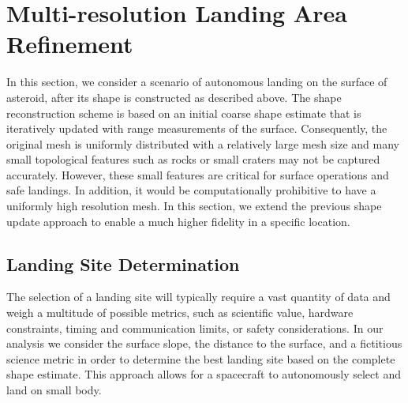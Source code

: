\documentclass[journal]{new-aiaa}
\begin{document}
\section{Multi-resolution Landing Area Refinement}\label{sec:landing_refinement}

In this section, we consider a scenario of autonomous landing on the surface of asteroid, after its shape is constructed as described above.
The shape reconstruction scheme is based on an initial coarse shape estimate that is iteratively updated with range measurements of the surface.
Consequently, the original mesh is uniformly distributed with a relatively large mesh size and many small topological features such as rocks or small craters may not be captured accurately.
However, these small features are critical for surface operations and safe landings.
In addition, it would be computationally prohibitive to have a uniformly high resolution mesh.
In this section, we extend the previous shape update approach to enable a much higher fidelity in a specific location.

\subsection{Landing Site Determination}

The selection of a landing site will typically require a vast quantity of data and weigh a multitude of possible metrics, such as scientific value, hardware constraints, timing and communication limits, or safety considerations. 
In our analysis we consider the surface slope, the distance to the surface, and a fictitious science metric in order to determine the best landing site based on the complete shape estimate.
This approach allows for a spacecraft to autonomously select and land on small body.
\end{document}
